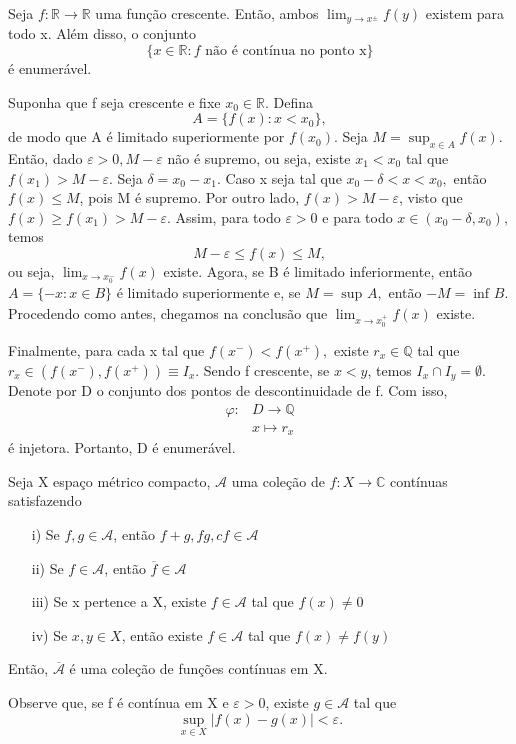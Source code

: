 \documentclass[measure_theory.tex]{subfiles}
\begin{document}
\begin{prop*}
	Seja \(f:\mathbb{R}\rightarrow \mathbb{R}\) uma função crescente. Então, ambos \(\lim_{y\to x^{\pm}}f(y)\) existem para todo x. Além disso, o conjunto
	\[
		\{x\in \mathbb{R}: f \text{ não é contínua no ponto x}\}
	\]
	é enumerável.
\end{prop*}
\begin{proof*}
	Suponha que f seja crescente e fixe \(x_{0}\in \mathbb{R}.\) Defina
	\[
		A = \{f(x): x < x_{0}\},
	\]
	de modo que A é limitado superiormente por \(f(x_{0})\). Seja \(M = \sup_{x\in A}f(x).\) Então, dado \(\varepsilon > 0, M - \varepsilon \) não é supremo, ou seja,
	existe \(x_{1} < x_{0}\) tal que \(f(x_{1}) > M - \varepsilon .\) Seja \(\delta  = x_{0} - x_{1}.\) Caso x seja tal que \(x_{0} - \delta < x < x_{0},\) então \(f(x) \leq M\), pois
	M é supremo. Por outro lado, \(f(x) > M - \varepsilon \), visto que \(f(x) \geq f(x_{1}) > M - \varepsilon .\) Assim, para todo \(\varepsilon > 0\) e para todo \(x\in (x_{0}-\delta , x_{0}),\) temos
	\[
		M - \varepsilon \leq f(x) \leq M,
	\]
	ou seja, \(\lim_{x\to x_{0}^{-}}f(x)\) existe.
	Agora, se B é limitado inferiormente, então \(A = \{-x: x\in B\}\) é limitado superiormente e, se \(M = \sup_{}A,\) então \(-M = \inf_{}B.\) Procedendo como antes, chegamos na conclusão
	que \(\lim_{x\to x_{0}^{+}}f(x)\) existe.

	Finalmente, para cada x tal que \(f(x^{-}) < f(x^{+}),\) existe \(r_{x}\in \mathbb{Q}\) tal que \(r_{x}\in (f(x^{-}), f(x^{+}))\equiv I_{x}.\) Sendo f crescente, se \(x < y\), temos
	\(I_{x}\cap I_{y} = \emptyset.\) Denote por D o conjunto dos pontos de descontinuidade de f. Com isso,
	\begin{align*}
		\varphi : & D\rightarrow \mathbb{Q} \\
		          & x \mapsto r_{x}
	\end{align*}
	é injetora. Portanto, D é enumerável. \qedsymbol
\end{proof*}
\begin{prop*}
	Seja X espaço métrico compacto, \(\mathcal{A}\) uma coleção de \(f:X\rightarrow \mathbb{C}\) contínuas satisfazendo
	\begin{itemize}
		\item[i)] Se \(f, g\in \mathcal{A}\), então \(f + g, fg, cf\in \mathcal{A}\)
		\item[ii)] Se \(f\in \mathcal{A}\), então \(\overline{f}\in \mathcal{A}\)
		\item[iii)] Se x pertence a X, existe \(f\in \mathcal{A}\) tal que \(f(x)\neq 0\)
		\item[iv)] Se \(x, y\in X\), então existe \(f\in \mathcal{A}\) tal que \(f(x)\neq f(y)\)
	\end{itemize}
	Então, \(\overline{\mathcal{A}}\) é uma coleção de funções contínuas em X.
\end{prop*}
Observe que, se f é contínua em X e \(\varepsilon > 0\), existe \(g\in \mathcal{A}\) tal que
\[
	\sup_{x\in X}|f(x) - g(x)| < \varepsilon.
\]
\end{document}
